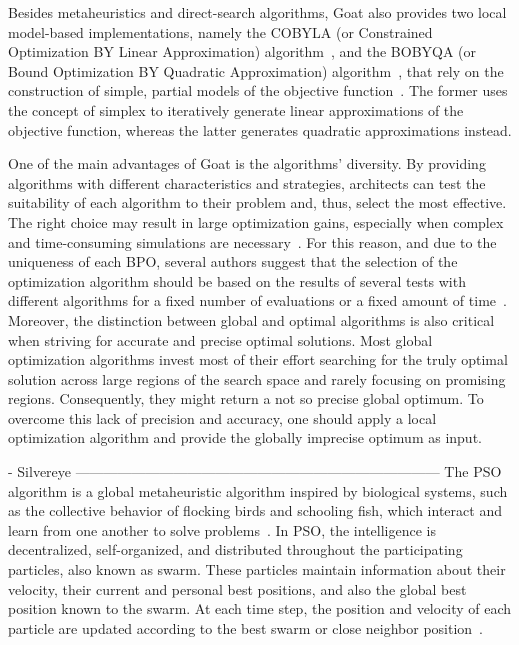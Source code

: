 Besides metaheuristics and direct-search algorithms, Goat also provides two local model-based implementations, namely the COBYLA (or Constrained Optimization BY Linear Approximation) algorithm~\cite{Powell1994COBYLA}, and the BOBYQA (or Bound Optimization BY Quadratic Approximation) algorithm~\cite{Powell2009BOBYQA}, that rely on the construction of simple, partial models of the objective function~\cite{Koziel2011}. The former uses the concept of simplex to iteratively generate linear approximations of the objective function, whereas the latter generates quadratic approximations instead. 

One of the main advantages of Goat is the algorithms' diversity. By providing algorithms with different characteristics and strategies, architects can test the suitability of each algorithm to their problem and, thus, select the most effective. The right choice may result in large optimization gains, especially when complex and time-consuming simulations are necessary~\cite{Wortmann2016BBO}. For this reason, and due to the uniqueness of each \ac{BPO}, several authors suggest that the selection of the optimization algorithm should be based on the results of several tests with different algorithms for a fixed number of evaluations or a fixed amount of time~\cite{Hamdy2016,Wortmann2016BBO}. Moreover, the distinction between global and optimal algorithms is also critical when striving for accurate and precise optimal solutions. Most global optimization algorithms invest most of their effort searching for the truly optimal solution across large regions of the search space and rarely focusing on promising regions. Consequently, they might return a not so precise global optimum. To overcome this lack of precision and accuracy, one should apply a local optimization algorithm and provide the globally imprecise optimum as input.

- Silvereye ------------------------------------------------------------------------------
The \ac{PSO} algorithm is a global metaheuristic algorithm inspired by biological systems, such as the collective behavior of flocking birds and schooling fish, which interact and learn from one another to solve problems~\cite{Brownlee2011}. In \ac{PSO}, the intelligence is decentralized, self-organized, and distributed throughout the participating particles, also known as swarm. These particles maintain information about their velocity, their current and personal best positions, and also the global best position known to the swarm. At each time step, the position and velocity of each particle are updated according to the best swarm or close neighbor position~\cite{Brownlee2011}.

